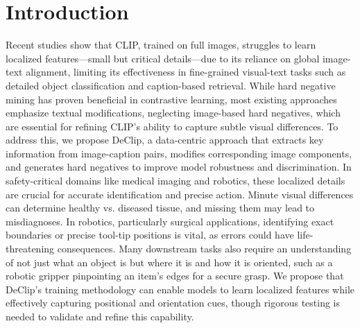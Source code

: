 \documentclass[11pt,letterpaper]{article}
\begin{document}
\section{Introduction}
Recent studies show that CLIP, trained on full images, struggles to learn localized features—small but critical details—due to its reliance on global image-text alignment, limiting its effectiveness in fine-grained visual-text tasks such as detailed object classification and caption-based retrieval. While hard negative mining has proven beneficial in contrastive learning, most existing approaches emphasize textual modifications, neglecting image-based hard negatives, which are essential for refining CLIP’s ability to capture subtle visual differences. To address this, we propose DeClip, a data-centric approach that extracts key information from image-caption pairs, modifies corresponding image components, and generates hard negatives to improve model robustness and discrimination. In safety-critical domains like medical imaging and robotics, these localized details are crucial for accurate identification and precise action. Minute visual differences can determine healthy vs. diseased tissue, and missing them may lead to misdiagnoses. In robotics, particularly surgical applications, identifying exact boundaries or precise tool-tip positions is vital, as errors could have life-threatening consequences. Many downstream tasks also require an understanding of not just what an object is but where it is and how it is oriented, such as a robotic gripper pinpointing an item’s edges for a secure grasp. We propose that DeClip’s training methodology can enable models to learn localized features while effectively capturing positional and orientation cues, though rigorous testing is needed to validate and refine this capability.



\end{document}
